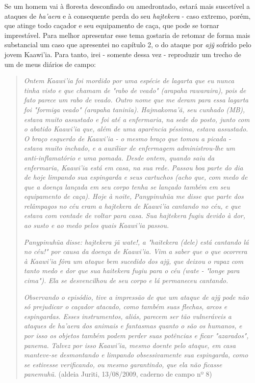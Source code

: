Se um homem vai à floresta desconfiado ou amedrontado, estará mais
suscetível a ataques de \emph{ha'aera} e à consequente perda do seu
\emph{hajtekera} - caso extremo, porém, que atinge todo caçador e seu
equipamento de caça, que pode se tornar imprestável. Para melhor
apresentar esse tema gostaria de retomar de forma mais substancial um
caso que apresentei no capítulo 2, o do ataque por \emph{ajỹ} sofrido
pelo jovem Kaawi'ia. Para tanto, irei - somente dessa vez - reproduzir
um trecho de um de meus diários de campo:

\begin{quote}
\emph{Ontem Kaawi'ia foi mordido por uma espécie de lagarta que eu nunca
tinha visto e que chamam de "rabo de veado" (arapaha rawaraira), pois de
fato parece um rabo de veado. Outro nome que me deram para essa lagarta
foi "formiga veado" (arapaha taninĩa). Hajmakoma'ã, seu cunhado (MB),
estava muito assustado e foi até a enfermaria, na sede do posto, junto
com o abatido Kaawi'ia que, além de uma aparência péssima, estava
assustado. O braço esquerdo de Kaawi'ia - o mesmo braço que tomou a
picada - estava muito inchado, e a auxiliar de enfermagem
administrou-lhe um anti-inflamatório e uma pomada. Desde ontem, quando
saiu da enfermaria, Kaawi'ia está em casa, na sua rede. Passou boa parte
do dia de hoje limpando sua espingarda e seus cartuchos (acho que, com
medo de que a doença lançada em seu corpo tenha se lançado também em seu
equipamento de caça). Hoje à noite, Panypinuhũa me disse que parte dos
relâmpagos no céu eram a hajtekera de Kaawi'ia cantando no céu, e que
estava com vontade de voltar para casa. Sua hajtekera fugiu devido à
dor, ao susto e ao medo pelos quais Kaawi'ia passou.}

\emph{Panypinuhũa disse: hajtekera jã wate!, a "haitekera (dele) está
cantando lá no céu!" por causa da doença de Kaawi'ia. Vim a saber que o
que ocorrera à Kaawi'ia fôra um ataque bem sucedido dos ajỹ, que deixou
o rapaz com tanto medo e dor que sua haitekera fugiu para o céu (wate -
"longe para cima"). Ela se desvencilhou de seu corpo e lá permaneceu
cantando.}

\emph{Observando o episódio, tive a impressão de que um ataque de ajỹ
pode não só prejudicar o caçador atacado, como também suas flechas,
arcos e espingardas. Esses instrumentos, aliás, parecem ser tão
vulneráveis a ataques de ha'aera dos animais e fantasmas quanto o são os
humanos, e por isso os objetos também podem perder suas potências e
ficar "azarados", panema. Talvez por isso Kaawi'ia, mesmo doente pelo
ataque, em casa manteve-se desmontando e limpando obsessivamente sua
espingarda, como se estivesse verificando, ou mesmo garantindo, que ela
não ficasse panemuhũ.} (aldeia Juriti, 13/08/2009, caderno de campo nº
8)
\end{quote}

